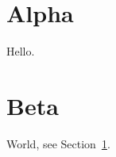\documentclass{article}
\begin{document}
\tableofcontents
\section{Alpha}\label{sec:a}
Hello.
\section{Beta}
World, see Section~\ref{sec:a}.
\end{document}
